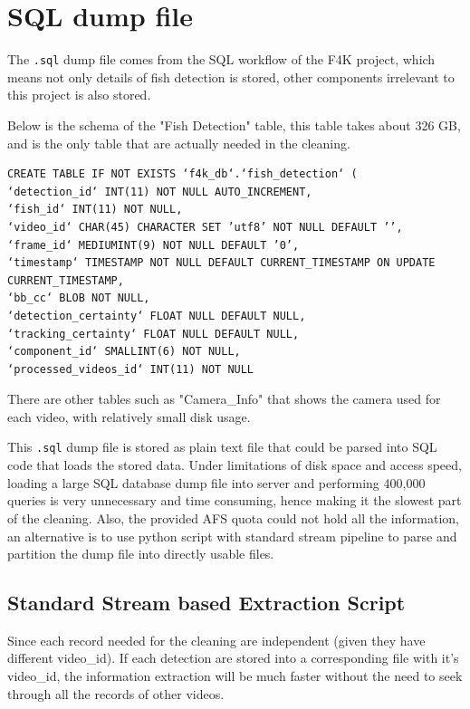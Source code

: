 \documentclass[bsc,logo,twoside,fullspacing,parskip]{infthesis}
\begin{document}
\section{SQL dump file}
\label{sec:sqld}

The {\tt .sql} dump file comes from the SQL workflow of the F4K project, which means not only details of fish detection is stored, other components irrelevant to this project is also stored. 

Below is the schema of the "Fish Detection" table, this table takes about 326 GB, and is the only table that are actually needed in the cleaning.

\lstset{basicstyle=\tiny\ttfamily,breaklines=true,style=sql}
\begin{lstlisting}[frame=single]
CREATE TABLE IF NOT EXISTS ‘f4k_db‘.‘fish_detection‘ (
‘detection_id‘ INT(11) NOT NULL AUTO_INCREMENT,
‘fish_id‘ INT(11) NOT NULL,
‘video_id‘ CHAR(45) CHARACTER SET ’utf8’ NOT NULL DEFAULT ’’,
‘frame_id‘ MEDIUMINT(9) NOT NULL DEFAULT ’0’,
‘timestamp‘ TIMESTAMP NOT NULL DEFAULT CURRENT_TIMESTAMP ON UPDATE CURRENT_TIMESTAMP,
‘bb_cc‘ BLOB NOT NULL,
‘detection_certainty‘ FLOAT NULL DEFAULT NULL,
‘tracking_certainty‘ FLOAT NULL DEFAULT NULL,
‘component_id‘ SMALLINT(6) NOT NULL,
‘processed_videos_id‘ INT(11) NOT NULL
\end{lstlisting}

There are other tables such as "Camera\_Info" that shows the camera used for each video, with relatively small disk usage.

This {\tt .sql} dump file is stored as plain text file that could be parsed into SQL code that loads the stored data.
Under limitations of disk space and access speed, loading a large SQL database dump file into server and performing 400,000 queries is very unnecessary and time consuming, hence making it the slowest part of the cleaning. Also, the provided AFS quota could not hold all the information, an alternative is to use python script with standard stream pipeline to parse and partition the dump file into directly usable files.

\subsection{Standard Stream based Extraction Script}

Since each record needed for the cleaning are independent (given they have different video\_id). If each detection are stored into a corresponding file with it's video\_id, the information extraction will be much faster without the need to seek through all the records of other videos.
\end{document}
